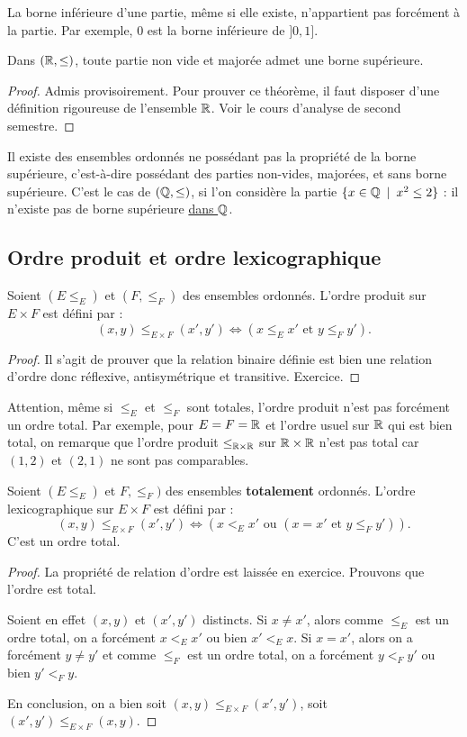 La borne inférieure d'une partie, même si elle existe, n'appartient pas forcément à la partie. Par exemple, $0$ est la borne inférieure de $]0,1]$.

\begin{theoreme}
Dans $(\mathbb{R},\leq)$, toute partie non vide et majorée admet une borne supérieure.
\end{theoreme}
\begin{proof}
Admis provisoirement. Pour prouver ce théorème, il faut disposer d'une définition rigoureuse de l'ensemble $\mathbb{R}$. Voir le cours d'analyse de second semestre.
\end{proof}

Il existe des ensembles ordonnés ne possédant pas la propriété de la borne supérieure, c'est-à-dire possédant des parties non-vides, majorées, et sans borne supérieure. C'est le cas de $(\mathbb{Q},\leq)$, si l'on considère la partie $\{x\in \mathbb{Q}\:\mid\: x^2\leq 2\}$ : il n'existe pas de borne supérieure \underline{dans $\mathbb{Q}$}.


\subsection{Ordre produit et ordre lexicographique}

\begin{propdef}
Soient $(E\leq_E)$ et $(F,\leq_F)$ des ensembles ordonnés.
L'ordre produit sur $E\times F$ est défini par :
\[
(x,y) \leq_{E\times F} (x',y') \iff \left(x\leq_E x' \text{ et } y\leq_F y'\right).
\]
\end{propdef}
\begin{proof}
Il s'agit de prouver que la relation binaire définie est bien une relation d'ordre donc réflexive, antisymétrique et transitive. Exercice.
\end{proof}

Attention, même si $\leq_E$ et $\leq_F$ sont totales, l'ordre produit n'est pas forcément un ordre total. Par exemple, pour $E=F=\mathbb{R}$ et l'ordre usuel sur $\mathbb{R}$ qui est bien total, on remarque que l'ordre produit $\leq_{\mathbb{R}\times\mathbb{R}}$ sur $\mathbb{R}\times \mathbb{R}$ n'est pas total car $(1,2)$ et $(2,1)$ ne sont pas comparables.

\begin{propdef}
Soient $(E\leq_E)$ et $F,\leq_F)$ des ensembles \textbf{totalement} ordonnés.
L'ordre lexicographique sur $E\times F$ est défini par :
\[
(x,y) \leq_{E\times F} (x',y') \iff \left(x<_E x' \text{ ou } (x=x' \text{ et } y\leq_F y')\right).
\]
C'est un ordre total.
\end{propdef}
\begin{proof}
La propriété de relation d'ordre est laissée en exercice. Prouvons que l'ordre est total.

Soient en effet $(x,y)$ et $(x',y')$ distincts.
Si $x\neq x'$, alors comme $\leq_E$ est un ordre total, on a forcément $x<_E x'$ ou bien $x'<_E x$.
Si $x=x'$, alors on a forcément $y\neq y'$ et comme $\leq_F$ est un ordre total, on a forcément $y <_F y'$ ou bien $y'<_F y$.

En conclusion, on a bien soit $(x,y) \leq_{E\times F} (x',y')$, soit  $(x',y') \leq_{E\times F} (x,y)$.
\end{proof}

